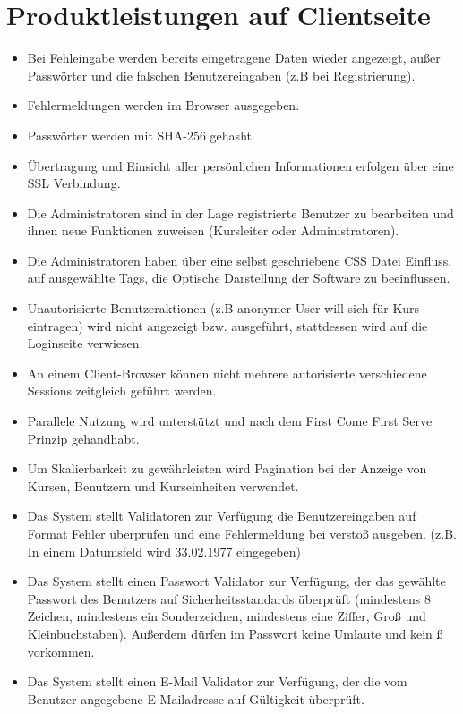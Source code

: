 \documentclass[a4paper]{scrreprt}
\begin{document}
\section{Produktleistungen auf Clientseite}
\begin{itemize}
	\item \Func{} Bei Fehleingabe werden bereits eingetragene Daten wieder angezeigt, außer Passwörter und die falschen Benutzereingaben (z.B bei Registrierung).
	\item \Func{} Fehlermeldungen werden im Browser ausgegeben.
	\item \Func{} Passwörter werden mit SHA-256 gehasht.
	\item \Func{} Übertragung und Einsicht aller persönlichen Informationen erfolgen über eine SSL Verbindung.
	\item \Func{} Die Administratoren sind in der Lage registrierte Benutzer zu bearbeiten und ihnen neue Funktionen zuweisen (Kursleiter oder Administratoren).
	\item \Func{} Die Administratoren haben über eine selbst geschriebene CSS Datei Einfluss, auf ausgewählte Tags, die Optische Darstellung der Software zu beeinflussen. 
	\item \Func{} Unautorisierte Benutzeraktionen (z.B anonymer User will sich für Kurs eintragen) wird nicht angezeigt bzw. ausgeführt, stattdessen wird auf die Loginseite verwiesen.
	\item \Func{} An einem Client-Browser können nicht mehrere autorisierte verschiedene Sessions zeitgleich geführt werden.
	\item \Func{} Parallele Nutzung wird unterstützt und nach dem First Come First Serve Prinzip gehandhabt.
	\item \Func{} Um Skalierbarkeit zu gewährleisten wird Pagination bei der Anzeige von Kursen, Benutzern und Kurseinheiten verwendet. 
	\item \Func{} Das System stellt Validatoren zur Verfügung die Benutzereingaben auf Format Fehler überprüfen und eine Fehlermeldung bei verstoß ausgeben. (z.B. In einem Datumsfeld wird 33.02.1977 eingegeben)
	\item \Func{} Das System stellt einen Passwort Validator zur Verfügung, der das gewählte Passwort des Benutzers auf Sicherheitsstandards überprüft (mindestens 8 Zeichen, mindestens ein Sonderzeichen, mindestens eine Ziffer, Groß und Kleinbuchstaben). Außerdem dürfen im Passwort keine Umlaute und kein ß vorkommen.
	\item \Func{} Das System stellt einen E-Mail Validator zur Verfügung, der die vom Benutzer angegebene E-Mailadresse auf Gültigkeit überprüft.

\end{itemize}
\end{document}
